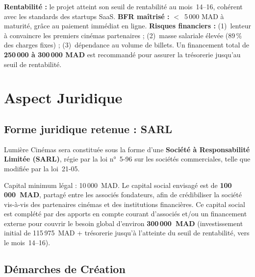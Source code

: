 \documentclass[12pt,a4paper,openany]{report}
\begin{document}
\begin{warningbox}
\textbf{Rentabilité :} le projet atteint son seuil de rentabilité au mois~14–16, cohérent avec les standards des startups SaaS.
\textbf{BFR maîtrisé :} $<$~5\,000 MAD à maturité, grâce au paiement immédiat en ligne.
\textbf{Risques financiers :} (1)~lenteur à convaincre les premiers cinémas partenaires ; (2)~masse salariale élevée (89\,\% des charges fixes) ; (3)~dépendance au volume de billets.
Un financement total de \textbf{250\,000 à 300\,000 MAD} est recommandé pour assurer la trésorerie jusqu'au seuil de rentabilité.
\end{warningbox}

\section{Aspect Juridique}

\subsection{Forme juridique retenue : SARL}

Lumière Cinémas sera constituée sous la forme d'une \textbf{Société à Responsabilité Limitée (SARL)}, régie par la loi n°~5-96 sur les sociétés commerciales, telle que modifiée par la loi~21-05.

Capital minimum légal : 10\,000~MAD. Le capital social envisagé est de \textbf{100\,000~MAD}, partagé entre les associés fondateurs, afin de crédibiliser la société vis-à-vis des partenaires cinémas et des institutions financières. Ce capital social est complété par des apports en compte courant d'associés et/ou un financement externe pour couvrir le besoin global d'environ \textbf{300\,000~MAD} (investissement initial de 115\,975~MAD + trésorerie jusqu'à l'atteinte du seuil de rentabilité, vers le mois~14--16).

\subsection{Démarches de Création}
\end{document}
